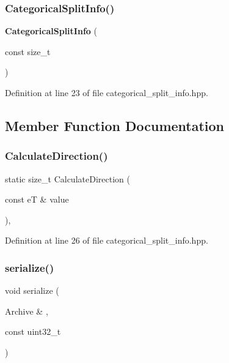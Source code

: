 \subsubsection{Categorical\+Split\+Info()}
{\footnotesize\ttfamily \textbf{ Categorical\+Split\+Info} (\begin{DoxyParamCaption}\item[{const size\+\_\+t}]{ }\end{DoxyParamCaption})\hspace{0.3cm}{\ttfamily [inline]}}



Definition at line 23 of file categorical\+\_\+split\+\_\+info.\+hpp.



\subsection{Member Function Documentation}
\mbox{\label{classmlpack_1_1tree_1_1CategoricalSplitInfo_ac1f5e439aa34731eafc789cdb2d6e09f}} 
\subsubsection{Calculate\+Direction()}
{\footnotesize\ttfamily static size\+\_\+t Calculate\+Direction (\begin{DoxyParamCaption}\item[{const eT \&}]{value }\end{DoxyParamCaption})\hspace{0.3cm}{\ttfamily [inline]}, {\ttfamily [static]}}



Definition at line 26 of file categorical\+\_\+split\+\_\+info.\+hpp.

\mbox{\label{classmlpack_1_1tree_1_1CategoricalSplitInfo_aa2ccb5a0533a6ba0abe6dfc1f98fbafb}} 
\subsubsection{serialize()}
{\footnotesize\ttfamily void serialize (\begin{DoxyParamCaption}\item[{Archive \&}]{,  }\item[{const uint32\+\_\+t}]{ }\end{DoxyParamCaption})\hspace{0.3cm}{\ttfamily [inline]}}



